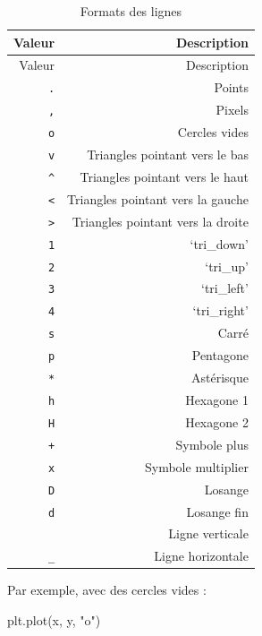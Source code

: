 \documentclass[
  12pt,
]{book}
\newenvironment{Shaded}{\begin{snugshade}}{\end{snugshade}}
\newcommand{\NormalTok}[1]{#1}
\newcommand{\StringTok}[1]{\textcolor[rgb]{0.31,0.60,0.02}{#1}}
\numberwithin{equation}{section}
\numberwithin{countremarque}{section}
\begin{document}
\begin{longtable}[]{@{}rr@{}}
\caption{\label{tab:fmt-lignes-marqueurs} Formats des lignes}\tabularnewline
\toprule\noalign{}
Valeur & Description \\
\midrule\noalign{}
\endfirsthead
\toprule\noalign{}
Valeur & Description \\
\midrule\noalign{}
\endhead
\bottomrule\noalign{}
\endlastfoot
\texttt{.} & Points \\
\texttt{,} & Pixels \\
\texttt{o} & Cercles vides \\
\texttt{v} & Triangles pointant vers le bas \\
\texttt{\^{}} & Triangles pointant vers le haut \\
\texttt{\textless{}} & Triangles pointant vers la gauche \\
\texttt{\textgreater{}} & Triangles pointant vers la droite \\
\texttt{1} & `tri\_down' \\
\texttt{2} & `tri\_up' \\
\texttt{3} & `tri\_left' \\
\texttt{4} & `tri\_right' \\
\texttt{s} & Carré \\
\texttt{p} & Pentagone \\
\texttt{*} & Astérisque \\
\texttt{h} & Hexagone 1 \\
\texttt{H} & Hexagone 2 \\
\texttt{+} & Symbole plus \\
\texttt{x} & Symbole multiplier \\
\texttt{D} & Losange \\
\texttt{d} & Losange fin \\
\texttt{\textbar{}} & Ligne verticale \\
\texttt{\_} & Ligne horizontale \\
\end{longtable}

Par exemple, avec des cercles vides :

\begin{Shaded}
\begin{Highlighting}[]
\NormalTok{plt.plot(x, y, }\StringTok{"o"}\NormalTok{)}
\end{Highlighting}
\end{Shaded}
\end{document}
